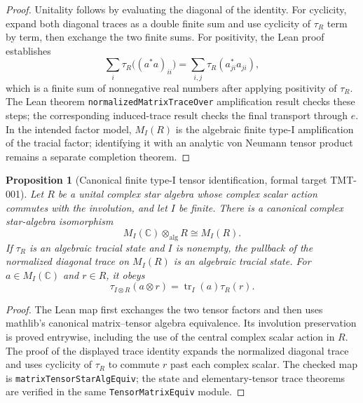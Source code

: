 \documentclass{article}
\newtheorem{proposition}[definition]{Proposition}
\begin{document}
\begin{proof}
Unitality follows by evaluating the diagonal of the identity.  For cyclicity,
expand both diagonal traces as a double finite sum and use cyclicity of
\(\tau_R\) term by term, then exchange the two finite sums.  For positivity,
the Lean proof establishes
\begin{equation*}
  \sum_i \tau_R\bigl((a^*a)_{ii}\bigr)
  =\sum_{i,j}\tau_R(a_{ji}^*a_{ji}),
\end{equation*}
which is a finite sum of nonnegative real numbers after applying positivity of
\(\tau_R\).  The Lean theorem
\texttt{normalizedMatrixTraceOver} amplification result checks these steps;
the corresponding induced-trace result checks the final transport through
\(e\).  In the intended factor model,
\(M_I(R)\) is the algebraic finite type-I amplification of the tracial
factor; identifying it with an analytic von Neumann tensor product remains a
separate completion theorem.
\end{proof}

\begin{proposition}[Canonical finite type-I tensor identification, formal target TMT-001]
\label{prop:canonical_matrix_tensor}
Let $R$ be a unital complex star algebra whose complex scalar action
commutes with the involution, and let $I$ be finite.  There is a canonical
complex star-algebra isomorphism
\begin{equation*}
  M_I(\mathbb C)\otimes_{\mathrm{alg}}R
  \cong M_I(R).
\end{equation*}
If $\tau_R$ is an algebraic tracial state and $I$ is nonempty, the
pullback of the normalized diagonal trace on $M_I(R)$ is an algebraic
tracial state.  For $a\in M_I(\mathbb C)$ and $r\in R$, it obeys
\begin{equation*}
  \tau_{I\otimes R}(a\otimes r)=\operatorname{tr}_I(a)\tau_R(r).
\end{equation*}
\end{proposition}

\begin{proof}
The Lean map first exchanges the two tensor factors and then uses mathlib's
canonical matrix--tensor algebra equivalence.  Its involution preservation is
proved entrywise, including the use of the central complex scalar action in
$R$.  The proof of the displayed trace identity expands the normalized
diagonal trace and uses cyclicity of $\tau_R$ to commute $r$ past each
complex scalar.  The checked map is
\texttt{matrixTensorStarAlgEquiv}; the state and elementary-tensor trace
theorems are verified in the same \texttt{TensorMatrixEquiv} module.
\end{proof}
\end{document}
